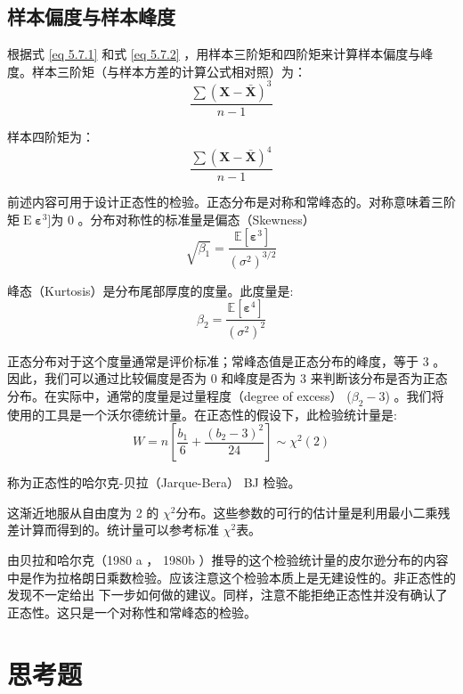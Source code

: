 \subsection{样本偏度与样本峰度}
根据式 \ref{eq 5.7.1} 和式 \ref{eq 5.7.2} ，用样本三阶矩和四阶矩来计算样本偏度与峰度。样本三阶矩（与样本方差的计算公式相对照）为：
\begin{equation}
     \frac{\sum( \boldsymbol{X-\bar{X}})^{3}}{n-1} 
\end{equation}

样本四阶矩为：
\begin{equation}
    \frac{\sum(\boldsymbol{ X-\bar{X}})^{4}}{n-1}
\end{equation}

前述内容可用于设计正态性的检验。正态分布是对称和常峰态的。对称意味着三阶矩$ \operatorname{E}\boldsymbol{ \varepsilon }^{ 3 } ]$为 0 。分布对称性的标准量是偏态（Skewness）
$$  \sqrt{\beta_{1}}=\frac{\mathbb{E}\left[ \boldsymbol{ \varepsilon }^{3}\right]}{\left(\sigma^{2}\right)^{3 / 2}} $$

峰态（Kurtosis）是分布尾部厚度的度量。此度量是:
$$ \beta_{2}=\frac{\mathbb{E}\left[\boldsymbol{ \varepsilon }^{4}\right]}{\left(\sigma^{2}\right)^{2}} $$

正态分布对于这个度量通常是评价标准；常峰态值是正态分布的峰度，等于 3 。因此，我们可以通过比较偏度是否为 0 和峰度是否为 3 来判断该分布是否为正态分布。在实际中，通常的度量是过量程度（degree of excess）
($ \beta_{2} -3 $) 。我们将使用的工具是一个沃尔德统计量。在正态性的假设下，此检验统计量是:
$$ W=n\left[\frac{b_{1}}{6}+\frac{\left(b_{2}-3\right)^{2}}{24}\right] \sim \chi^{2}(2) $$

称为正态性的哈尔克-贝拉（Jarque-Bera） BJ 检验。

这渐近地服从自由度为 2 的 $ \chi^{2} $分布。这些参数的可行的估计量是利用最小二乘残差计算而得到的。统计量可以参考标准 $ \chi^{2}$表。

由贝拉和哈尔克（1980 a ， 1980b ）推导的这个检验统计量的皮尔逊分布的内容中是作为拉格朗日乘数检验。应该注意这个检验本质上是无建设性的。非正态性的发现不一定给出
下一步如何做的建议。同样，注意不能拒绝正态性并没有确认了正态性。这只是一个对称性和常峰态的检验。

\section{思考题}

